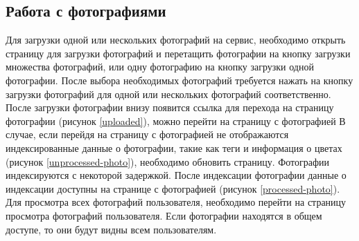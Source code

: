 \subsection{Работа с фотографиями}
Для загрузки одной или нескольких фотографий на сервис, необходимо открыть страницу для загрузки фотографий и перетащить фотографии на кнопку загрузки множества фотографий, или одну фотографию на кнопку загрузки одной фотографии.
После выбора необходимых фотографий требуется нажать на кнопку загрузки фотографий для одной или нескольких фотографий соответственно.
После загрузки фотографии внизу появится ссылка для перехода на страницу фотографии (рисунок \ref{uploaded}), можно перейти на страницу с фотографией 
В случае, если перейдя на страницу с фотографией не отображаются индексированные данные о фотографии, такие как теги и информация о цветах (рисунок \ref{unprocessed-photo}), необходимо обновить страницу.
Фотографии индексируются с некоторой задержкой.
После индексации фотографии данные о индексации доступны на странице с фотографией (рисунок \ref{processed-photo}).
Для просмотра всех фотографий пользователя, необходимо перейти на страницу просмотра фотографий пользователя.
Если фотографии находятся в общем доступе, то они будут видны всем пользователям.

\clearpage